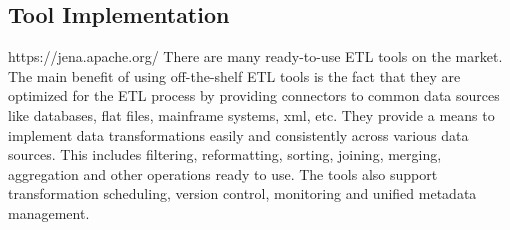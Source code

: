 \subsection{Tool Implementation}
https://jena.apache.org/
There are many ready-to-use ETL tools on the market. The main benefit of using off-the-shelf ETL tools is the fact that they are optimized for the ETL process by providing connectors to common data sources like databases, flat files, mainframe systems, xml, etc. They provide a means to implement data transformations easily and consistently across various data sources. This includes filtering, reformatting, sorting, joining, merging, aggregation and other operations ready to use. The tools also support transformation scheduling, version control, monitoring and unified metadata management. 